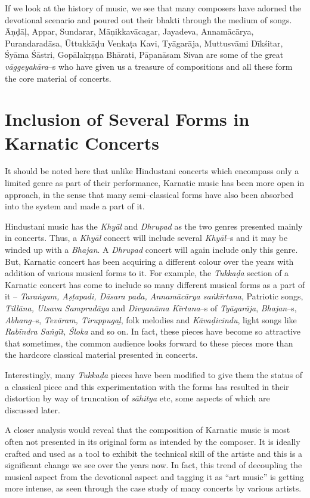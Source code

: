 If we look at the history of music, we see that many composers have adorned the devotional scenario and poured out their bhakti through the medium of songs. Āṇḍāḷ, Appar, Sundarar, Māṇikkavācagar, Jayadeva, Annamācārya, Purandaradāsa, Ūttukkāḍu Venkaṭa Kavi, Tyāgarāja, Muttusvāmi Dīkśitar, Śyāma Śāstri, Gopālakṛṣṇa Bhārati, Pāpanāsam Sivan are some of the great \textit{vāggeyakāra}–s who have given us a treasure of compositions and all these form the core material of concerts.


\section*{Inclusion of Several Forms in Karnatic Concerts}

It should be noted here that unlike Hindustani concerts which encompass only a limited genre as part of their performance, Karnatic music has been more open in approach, in the sense that many semi–classical forms have also been absorbed into the system and made a part of it.

Hindustani music has the \textit{Khyāl} and \textit{Dhrupad} as the two genres presented mainly in concerts. Thus, a \textit{Khyāl} concert will include several \textit{Khyāl}–s and it may be winded up with a \textit{Bhajan}. A \textit{Dhrupad} concert will again include only this genre. But, Karnatic concert has been acquiring a different colour over the years with addition of various musical forms to it. For example, the \textit{Tukkaḍa} section of a Karnatic concert has come to include so many different musical forms as a part of it – \textit{Taraṅgam, Aṣṭapadi, Dāsara pada, Annamācārya saṅkīrtana}, Patriotic songs, \textit{Tillāna, Utsava Sampradāya} and \textit{Divyanāma Kīrtana}–s of \textit{Tyāgarāja}, \textit{Bhajan}–s, \textit{Abhang}–s, \textit{Tevāram, Tiruppugaḻ}, folk melodies and \textit{Kāvaḍicindu}, light songs like \textit{Rabīndra Saṅgīt, Śloka} and so on. In fact, these pieces have become so attractive that sometimes, the common audience looks forward to these pieces more than the hardcore classical material presented in concerts.

Interestingly, many \textit{Tukkaḍa} pieces have been modified to give them the status of a classical piece and this experimentation with the forms has resulted in their distortion by way of truncation of \textit{sāhitya} etc, some aspects of which are discussed later.

A closer analysis would reveal that the composition of Karnatic music is most often not presented in its original form as intended by the composer. It is ideally crafted and used as a tool to exhibit the technical skill of the artiste and this is a significant change we see over the years now. In fact, this trend of decoupling the musical aspect from the devotional aspect and tagging it as “art music” is getting more intense, as seen through the case study of many concerts by various artists.


